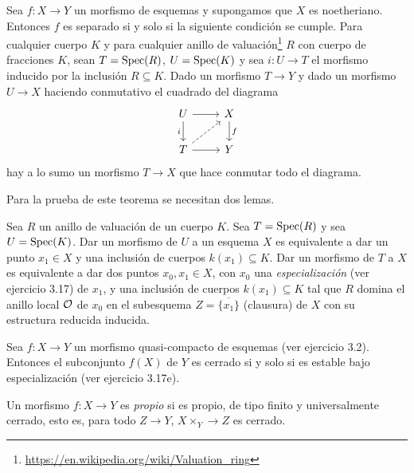\documentclass[GA.tex]{subfiles}
\begin{document}
\begin{teorema}
Sea $f:X\to Y$ un morfismo de esquemas y supongamos que $X$ es noetheriano. Entonces $f$ es separado si y solo si la siguiente condición se cumple. Para cualquier cuerpo $K$ y para cualquier anillo de valuación\footnote{\url{https://en.wikipedia.org/wiki/Valuation_ring}} $R$ con cuerpo de fracciones $K$, sean $T=\operatorname{Spec}(R)$, $U=\operatorname{Spec}(K)$ y sea $i:U\to T$ el morfismo inducido por la inclusión $R\subseteq K$. Dado un morfismo $T\to Y$ y dado un morfismo $U\to X$ haciendo conmutativo el cuadrado del diagrama
\[
\begin{tikzcd}
U\arrow[r]\arrow[d, "i"'] & X\arrow[d, "f"]\\
T\arrow[r]\arrow[ur, dashed] & Y
\end{tikzcd}
\]
hay a lo sumo un morfismo $T\to X$ que hace conmutar todo el diagrama. 
\end{teorema}

Para la prueba de este teorema se necesitan dos lemas.

\begin{lemma}
Sea $R$ un anillo de valuación de un cuerpo $K$. Sea $T=\operatorname{Spec}(R)$ y sea $U=\operatorname{Spec}(K)$. Dar un morfismo de $U$ a un esquema $X$ es equivalente a dar un punto $x_1\in X$ y una inclusión de cuerpos $k(x_1)\subseteq K$. Dar un morfismo de $T$ a $X$ es equivalente a dar dos puntos $x_0,x_1\in X$, con $x_0$ una \emph{especialización } (ver ejercicio 3.17) de $x_1$, y una inclusión de cuerpos $k(x_1)\subseteq K$ tal que $R$ domina el anillo local ${\mathcal O}$ de $x_0$ en el subesquema $Z=\overline{\{x_1\}}$ (clausura) de $X$ con su estructura reducida inducida. 
\end{lemma}



\begin{lemma}
Sea $f:X\to Y$ un morfismo quasi-compacto de esquemas (ver ejercicio 3.2). Entonces el subconjunto $f(X)$ de $Y$ es cerrado si y solo si es estable bajo especialización (ver ejercicio 3.17e). 
\end{lemma}


\begin{defi}
Un morfismo $f:X\to Y$ es \emph{propio} si es propio, de tipo finito y universalmente cerrado, esto es, para todo $Z\to Y$, $X\times_Y\to Z$ es cerrado.
\end{defi}
\end{document}
